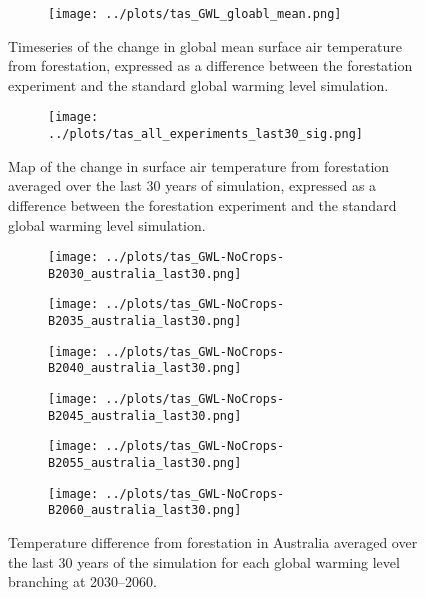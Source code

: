 \documentclass[]{article}
\begin{document}
\begin{figure}[H]
    \centering
    \begin{subfigure}[b]{\linewidth}
        \texttt{[image: ../plots/tas\_GWL\_gloabl\_mean.png]}
    \end{subfigure}
    \caption{Timeseries of the change in global mean surface air temperature from forestation, expressed as a difference between the forestation experiment and the standard global warming level simulation.}
    \label{fig:global_temperature_timeseries}
\end{figure}

\begin{figure}[H]
    \centering
    \begin{subfigure}[b]{\linewidth}
        \texttt{[image: ../plots/tas\_all\_experiments\_last30\_sig.png]}
    \end{subfigure}
    \caption{Map of the change in surface air temperature from forestation averaged over the last 30 years of simulation, expressed as a difference between the forestation experiment and the standard global warming level simulation.}
    \label{fig:temperature_map}
\end{figure}

\begin{figure}[H]
    \centering
    \begin{subfigure}[b]{0.4\linewidth}
        \texttt{[image: ../plots/tas\_GWL-NoCrops-B2030\_australia\_last30.png]}
    \end{subfigure}
    \begin{subfigure}[b]{0.4\linewidth}
        \texttt{[image: ../plots/tas\_GWL-NoCrops-B2035\_australia\_last30.png]}
    \end{subfigure}
    \begin{subfigure}[b]{0.4\linewidth}
        \texttt{[image: ../plots/tas\_GWL-NoCrops-B2040\_australia\_last30.png]}
    \end{subfigure}
    \begin{subfigure}[b]{0.4\linewidth}
        \texttt{[image: ../plots/tas\_GWL-NoCrops-B2045\_australia\_last30.png]}
    \end{subfigure}
    \begin{subfigure}[b]{0.4\linewidth}
        \texttt{[image: ../plots/tas\_GWL-NoCrops-B2055\_australia\_last30.png]}
    \end{subfigure}
    \begin{subfigure}[b]{0.4\linewidth}
        \texttt{[image: ../plots/tas\_GWL-NoCrops-B2060\_australia\_last30.png]}
    \end{subfigure}
    \caption{Temperature difference from forestation in Australia averaged over the last 30 years of the simulation for each global warming level branching at 2030–2060.   
    }
    \label{fig:tas_australia}
\end{figure}
\end{document}
